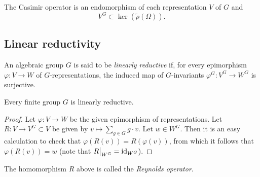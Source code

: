 \documentclass[11pt, english]{article}
\begin{document}
\begin{corr}
 The Casimir operator is an endomorphism of each representation $V$ of $G$ and 
$$
V^G \subset \ker ( \tilde \rho(\Omega)).
$$
\end{corr}


\subsection{Linear reductivity}

\begin{defi}
An algebraic group $G$ is said to be \emph{linearly reductive} if, for every epimorphism $\varphi:V \to W$ of $G$-representations, the induced map of $G$-invariants $\varphi^G:V^G \to W^G$ is surjective.
\end{defi}

\begin{prop}
Every finite group $G$ is linearly reductive.
\end{prop}

\begin{proof}
Let $\varphi: V \to W$ be the given epimorphism of representations. Let $ R:V \to V^G \subset V$ be given by $v \mapsto \sum_{g \in G} g\cdot v$. Let $w \in W^G$. Then it is an easy calculation to check that $\varphi(R(v))=R(\varphi(v))$, from which it follows that $\varphi(R(v))=w$ (note that $\restr{R}{W^G}=\id_{W^G}$).
\end{proof}

The homomorphism $R$ above is called the \emph{Reynolds operator}.
\end{document}
